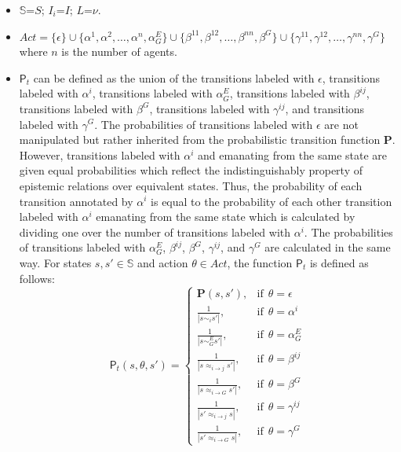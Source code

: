 \begin{itemize}
\item $\mathbb{S}$=$S$; $I_i$=$I$; $L$=$\nu$.

\item $Act = \{\epsilon \} \cup \{\alpha^1, \alpha^2, \dots, \alpha^n, \alpha_G^E\} \cup \{\beta^{11}, \beta^{12}, \dots, \beta^{nn}, \beta^{G}\} \cup \{\gamma^{11}, \gamma^{12}, \dots, \gamma^{nn}, \gamma^{G}\}$ where $n$ is the number of agents.


\item $\textsf{P}_t$ can be defined as the union of the transitions labeled with $\epsilon$,
 transitions labeled with $\alpha^i$, transitions labeled with $\alpha_G^E$, transitions labeled with $\beta^{ij}$, transitions labeled with $\beta^{G}$, transitions labeled with $\gamma^{ij}$, and transitions labeled with $\gamma^{G}$. The probabilities of transitions labeled with $\epsilon$ are not manipulated but rather inherited from the probabilistic transition function $\textbf{P}$. However, transitions labeled with $\alpha^i$ and emanating from the same state are given equal probabilities which reflect the indistinguishably property of epistemic relations over equivalent states. Thus, the probability of each transition annotated by $\alpha^i$ is equal to the probability of each other transition labeled with $\alpha^i$ emanating from the same state which is calculated by dividing one over the number of transitions labeled with $\alpha^i$. The probabilities of transitions labeled with $\alpha_G^E$, $\beta^{ij}$, $\beta^{G}$, $\gamma^{ij}$, and $\gamma^{G}$ are calculated in the same way. For states $s, s' \in \mathbb{S}$ and  action $\theta \in Act$, the function $\textsf{P}_t$ is defined as follows:
\begin{equation*}
    \textsf{P}_t(s, \theta , s' )=
\begin{cases}
    \textbf{P}(s, s'),          & \textrm{if}  ~~\theta = \epsilon  \\
    \frac{1}{|s\sim_i s'|},     & \textrm{if}  ~~ \theta = \alpha^i\\
    \frac{1}{|s\sim_G^E s'|},     & \textrm{if}  ~~ \theta = \alpha_G^E\\
    \frac{1}{|s\approx_{i \rightarrow j} s'|},   & \textrm{if}  ~~ \theta = \beta^{ij}\\
    \frac{1}{|s\approx_{i \rightarrow G} s'|},   & \textrm{if}  ~~ \theta = \beta^{G}\\
    \frac{1}{|s'\approx_{i \rightarrow j} s|},   & \textrm{if}  ~~ \theta = \gamma^{ij}\\
    \frac{1}{|s'\approx_{i \rightarrow G} s|},   & \textrm{if}  ~~ \theta = \gamma^{G}
    \end{cases}
    \end{equation*}

\end{itemize}

